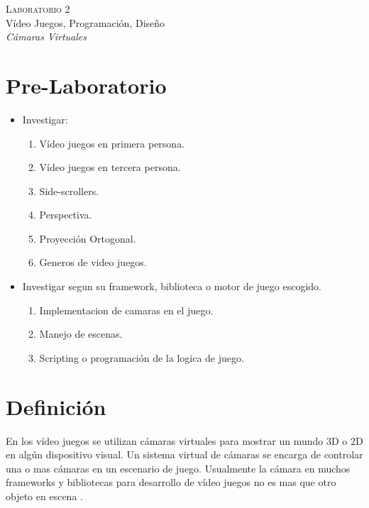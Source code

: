 \begin{center}
\textsc{\Large Laboratorio 2}~\\
{\large Vídeo Juegos, Programación, Diseño}~\\
\emph{Cámaras Virtuales}
\end{center}

\section{Pre-Laboratorio}
\begin{itemize}
\item Investigar:
\begin{enumerate}
  \item Vídeo juegos en primera persona.
  \item Vídeo juegos en tercera persona.
  \item Side-scrollers.
  \item Perspectiva.
  \item Proyección Ortogonal.
  \item Generos de video juegos.
\end{enumerate}
\item Investigar segun su framework, biblioteca o motor de juego escogido.
\begin{enumerate}
	\item Implementacion de camaras en el juego.
	\item Manejo de escenas.
	\item Scripting o programación de la logica de juego.
\end{enumerate}
\end{itemize}
\section{Definición}
En los vídeo juegos se utilizan cámaras virtuales para mostrar un mundo 3D o 2D en algún dispositivo visual. Un sistema virtual de cámaras se encarga de controlar una o mas cámaras en un escenario de juego. Usualmente la cámara en muchos frameworks y bibliotecas para desarrollo de vídeo juegos no es mas que otro objeto en escena \cite{fund_gamedesign}.

